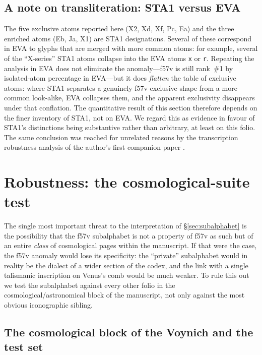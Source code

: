\subsection{A note on transliteration: STA1 versus EVA}
\label{sec:eva_caveat}

The five exclusive atoms reported here (X2, Xd, Xf, Pc, Ea) and the three
enriched atoms (Eb, Ja, X1) are STA1 designations. Several of these
correspond in EVA to glyphs that are merged with more common atoms: for
example, several of the ``X-series'' STA1 atoms collapse into the EVA atoms
\texttt{x} or \texttt{r}. Repeating the analysis in EVA does not eliminate
the anomaly---f57v is still rank~\#1 by isolated-atom percentage in EVA---but
it does \emph{flatten} the table of exclusive atoms: where STA1 separates a
genuinely f57v-exclusive shape from a more common look-alike, EVA collapses
them, and the apparent exclusivity disappears under that conflation. The
quantitative result of this section therefore depends on the finer
inventory of STA1, not on EVA. We regard this as evidence in favour of
STA1's distinctions being substantive rather than arbitrary, at least on
this folio. The same conclusion was reached for unrelated reasons by the
transcription robustness analysis of the author's first companion paper
\citep{jimenez2026negative}.


\section{Robustness: the cosmological-suite test}
\label{sec:f70r}

The single most important threat to the interpretation of \S\ref{sec:subalphabet}
is the possibility that the f57v subalphabet is not a property of f57v as such
but of an entire \emph{class} of cosmological pages within the manuscript. If
that were the case, the f57v anomaly would lose its specificity: the
``private'' subalphabet would in reality be the dialect of a wider section of
the codex, and the link with a single talismanic inscription on Venus's comb
would be much weaker. To rule this out we test the subalphabet against every
other folio in the cosmological/astronomical block of the manuscript, not only
against the most obvious iconographic sibling.

\subsection{The cosmological block of the Voynich and the test set}
\label{sec:cosmoblock}

